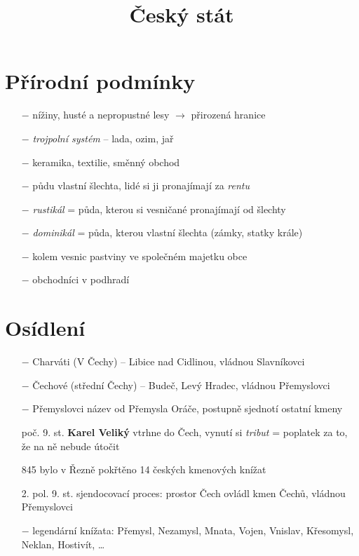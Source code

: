 \documentclass{article}
\title{\vspace{-2cm}Český stát\vspace{-1.7cm}}
\date{}
\author{}
\begin{document}
\maketitle
\section*{Přírodní podmínky}
\begin{itemize}
    \vspace{-0.5em}
    \setlength\itemsep{0.15em}
    \item[$-$] nížiny, husté a nepropustné lesy $\rightarrow$ přirozená hranice
    \item[$-$] \textit{trojpolní systém} -- lada, ozim, jař
    \item[$-$] keramika, textilie, směnný obchod
    \item[$-$] půdu vlastní šlechta, lidé si ji pronajímají za \textit{rentu}
    \item[$-$] \textit{rustikál} = půda, kterou si vesničané pronajímají od šlechty
    \item[$-$] \textit{dominikál} = půda, kterou vlastní šlechta (zámky, statky krále)
    \item[$-$] kolem vesnic pastviny ve společném majetku obce
    \item[$-$] obchodníci v podhradí
\end{itemize}

\section*{Osídlení}
\begin{itemize}
    \vspace{-0.5em}
    \setlength\itemsep{0.15em}
    \item[$-$] Charváti (V Čechy) -- Libice nad Cidlinou, vládnou Slavníkovci
    \item[$-$] Čechové (střední Čechy) -- Budeč, Levý Hradec, vládnou Přemyslovci
    \item[$-$] Přemyslovci název od Přemysla Oráče, postupně sjednotí ostatní kmeny
\end{itemize}

\begin{itemize}
    \vspace{-0.5em}
    \setlength\itemsep{0.15em}
    \item[poč. 9. st.] \textbf{Karel Veliký} vtrhne do Čech, vynutí si \textit{tribut} = poplatek za to, že na ně nebude útočit
    \item[845] bylo v Řezně pokřtěno 14 českých kmenových knížat
    \item[2. pol. 9. st.] sjendocovací proces: prostor Čech ovládl kmen Čechů, vládnou Přemyslovci
    \item[$-$] legendární knížata: Přemysl, Nezamysl, Mnata, Vojen, Vnislav, Křesomysl, Neklan, Hostivít, \dots
\end{itemize}
\end{document}
